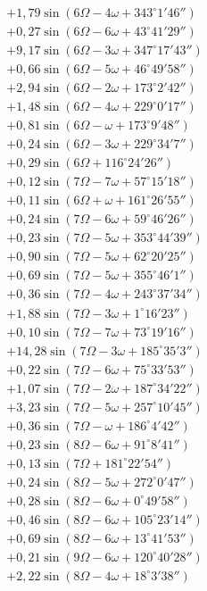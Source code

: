 \documentclass[10pt,a4paper]{article}
\begin{document}
\begin{align*}
&+ 1,79 \sin(6\Omega - 4\omega + 343^{\circ}1'46'') \\
&+ 0,27 \sin(6\Omega - 6\omega + 43^{\circ}41'29'') \\
&+ 9,17 \sin(6\Omega - 3\omega + 347^{\circ}17'43'') \\
&+ 0,66 \sin(6\Omega - 5\omega + 46^{\circ}49'58'') \\
&+ 2,94 \sin(6\Omega - 2\omega + 173^{\circ}2'42'') \\
&+ 1,48 \sin(6\Omega - 4\omega + 229^{\circ}0'17'') \\
&+ 0,81 \sin(6\Omega - \omega + 173^{\circ}9'48'') \\
&+ 0,24 \sin(6\Omega - 3\omega + 229^{\circ}34'7'') \\
&+ 0,29 \sin(6\Omega + 116^{\circ}24'26'') \\
&+ 0,12 \sin(7\Omega - 7\omega + 57^{\circ}15'18'') \\
&+ 0,11 \sin(6\Omega + \omega + 161^{\circ}26'55'') \\
&+ 0,24 \sin(7\Omega - 6\omega + 59^{\circ}46'26'') \\
&+ 0,23 \sin(7\Omega - 5\omega + 353^{\circ}44'39'') \\
&+ 0,90 \sin(7\Omega - 5\omega + 62^{\circ}20'25'') \\
&+ 0,69 \sin(7\Omega - 5\omega + 355^{\circ}46'1'') \\
&+ 0,36 \sin(7\Omega - 4\omega + 243^{\circ}37'34'') \\
&+ 1,88 \sin(7\Omega - 3\omega + 1^{\circ}16'23'') \\
&+ 0,10 \sin(7\Omega - 7\omega + 73^{\circ}19'16'') \\
&+ 14,28 \sin(7\Omega - 3\omega + 185^{\circ}35'3'') \\
&+ 0,22 \sin(7\Omega - 6\omega + 75^{\circ}33'53'') \\
&+ 1,07 \sin(7\Omega - 2\omega + 187^{\circ}34'22'') \\
&+ 3,23 \sin(7\Omega - 5\omega + 257^{\circ}10'45'') \\
&+ 0,36 \sin(7\Omega - \omega + 186^{\circ}4'42'') \\
&+ 0,23 \sin(8\Omega - 6\omega + 91^{\circ}8'41'') \\
&+ 0,13 \sin(7\Omega + 181^{\circ}22'54'') \\
&+ 0,24 \sin(8\Omega - 5\omega + 272^{\circ}0'47'') \\
&+ 0,28 \sin(8\Omega - 6\omega + 0^{\circ}49'58'') \\
&+ 0,46 \sin(8\Omega - 6\omega + 105^{\circ}23'14'') \\
&+ 0,69 \sin(8\Omega - 6\omega + 13^{\circ}41'53'') \\
&+ 0,21 \sin(9\Omega - 6\omega + 120^{\circ}40'28'') \\
&+ 2,22 \sin(8\Omega - 4\omega + 18^{\circ}3'38'')
\end{align*}
\end{document}
